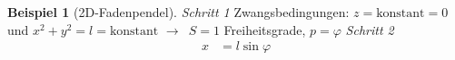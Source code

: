 \documentclass[oneside]{book}
\theoremstyle{definition}
\newtheorem*{beispiel*}{Beispiel}
\newcommand{\conseq}{$\rightarrow$~}
\renewcommand{\d}{\mathrm d}
\newcommand{\dd}[1]{\frac{\d}{\d #1}}
\newcommand{\ffpartial}[2]{\frac{\partial #1}{\partial #2}}
\newcommand{\const}{\text{konstant}}
\newcommand{\vp}{\varphi}
\begin{document}
\begin{beispiel*}[2D-Fadenpendel]
	\textit{Schritt 1} Zwangsbedingungen: $z = \const = 0$ und $x^2 + y^2 = l = \const$ \conseq $S = 1$ Freiheitsgrade, $p = \varphi$	
	\textit{Schritt 2}
	\begin{align*}
	x &= l \sin \varphi
	\end{align*}
\end{beispiel*}
\end{document}
